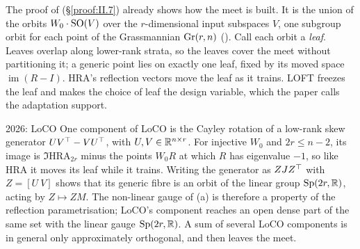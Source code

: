 The proof of  (\S\ref{proof:II.7}) already shows how the meet is built. It is the union of
the orbits $W_0\cdot\mathrm{SO}(V)$ over the $r$-dimensional input subspaces $V$, one subgroup orbit for each point of the
Grassmannian $\operatorname{Gr}(r,n)$ (). Call each orbit a \emph{leaf}. Leaves overlap along lower-rank strata, so the
leaves cover the meet without partitioning it; a generic point lies on exactly one leaf, fixed by its moved space
$\operatorname{im}(R-I)$. HRA's reflection vectors move the leaf as it trains. LOFT \citep{zhao2026loft} freezes the
leaf and makes the choice of leaf the design variable, which the paper calls the adaptation support.

\begin{remark*}{2026: LoCO}
One component of LoCO \citep{nguyen2026loco} is the Cayley rotation of a low-rank skew generator $UV^{\top}-VU^{\top}$, with
$U,V\in\mathbb{R}^{n\times r}$. For injective $W_0$ and $2r\le n-2$, its image is $\Im\mathrm{HRA}_{2r}$ minus the points $W_0R$
at which $R$ has eigenvalue $-1$, so like HRA it moves its leaf while it trains. Writing the generator as $ZJZ^{\top}$ with
$Z=[U\ V]$ shows that its generic fibre is an orbit of the linear group $\mathrm{Sp}(2r,\mathbb{R})$, acting by $Z\mapsto ZM$.
The non-linear gauge of (a) is therefore a property of the reflection parametrisation; LoCO's
component reaches an open dense part of the same set with the linear gauge $\mathrm{Sp}(2r,\mathbb{R})$. A sum of several LoCO components is in general only approximately
orthogonal, and then leaves the meet.
\end{remark*}

